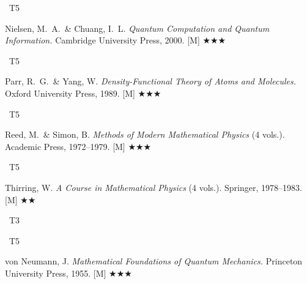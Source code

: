 \documentclass[11pt,a4paper]{article}
\newcommand{\tierbadge}[2]{\colorbox{#1}{\small\bfseries\color{white}\strut\ #2\ }}
\newcommand{\essential}{$\bigstar\bigstar\bigstar$}
\newcommand{\recommended}{$\bigstar\bigstar$}
\begin{document}
\begin{tcolorbox}[catbox]
\begin{enumerate}[leftmargin=2.5em,label=\textbf{[D\arabic*]},itemsep=3pt]
  \item \tierbadge{t5red}{T5} Nielsen, M.~A.\ \& Chuang, I.~L. \textit{Quantum Computation and Quantum Information.} Cambridge University Press, 2000. [M] \essential
  \item \tierbadge{t5red}{T5} Parr, R.~G.\ \& Yang, W. \textit{Density-Functional Theory of Atoms and Molecules.} Oxford University Press, 1989. [M] \essential
  \item \tierbadge{t5red}{T5} Reed, M.\ \& Simon, B. \textit{Methods of Modern Mathematical Physics} (4 vols.). Academic Press, 1972--1979. [M] \essential
  \item \tierbadge{t5red}{T5} Thirring, W. \textit{A Course in Mathematical Physics} (4 vols.). Springer, 1978--1983. [M] \recommended
  \item \tierbadge{t3purple}{T3}\tierbadge{t5red}{T5} von Neumann, J. \textit{Mathematical Foundations of Quantum Mechanics.} Princeton University Press, 1955. [M] \essential
\end{enumerate}
\end{tcolorbox}

\end{document}
